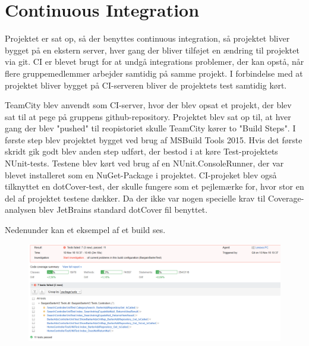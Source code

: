 \section{Continuous Integration}
Projektet er sat op, så der benyttes continuous integration, så projektet bliver bygget på en ekstern server, hver gang der bliver tilføjet en ændring til projektet via git. CI er blevet brugt for at undgå integrations problemer, der kan opstå, når flere gruppemedlemmer arbejder samtidig på samme projekt.
I forbindelse med at projektet bliver bygget på CI-serveren bliver de projektets test samtidig kørt.

TeamCity blev anvendt som CI-server, hvor der blev opsat et  projekt, der blev sat til at pege på gruppens github-repository. Projektet blev sat op til, at hver gang der blev "pushed" til reopistoriet skulle TeamCity kører to "Build Steps". I første step blev projektet bygget ved brug af MSBuild Tools 2015. Hvis det første skridt gik godt blev anden step udført, der bestod i at køre Test-projektets NUnit-tests. Testene blev kørt ved brug af en NUnit.ConsoleRunner, der var blevet installeret som en NuGet-Package i projektet.  
CI-projeket blev også tilknyttet en dotCover-test, der skulle fungere som et pejlemærke for, hvor stor en del af projektet testene dækker. Da der ikke var nogen specielle krav til Coverage-analysen blev JetBrains standard dotCover fil benyttet.

Nedenunder kan et eksempel af et build ses. 
\begin{figure}[ht!]
	\centering
	\includegraphics[width=120mm]{figures/TeamCityTest.png}
\end{figure}
